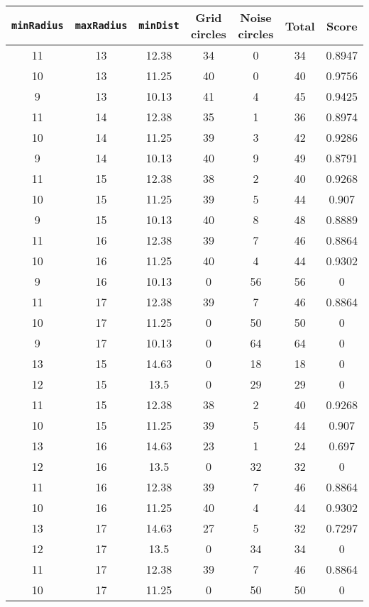 \documentclass[letterpaper, 12pt]{article}
\begin{document}
\begin{longtable}{|c|c|c|c|c|c|c|}
\hline
\textbf{\texttt{minRadius}} & \textbf{\texttt{maxRadius}} & \textbf{\texttt{minDist}} & \textbf{Grid circles} & \textbf{Noise circles} & \textbf{Total} & \textbf{Score} \\
\hline
11 & 13 & 12.38 & 34 & 0 & 34 & 0.8947 \\
\hline
10 & 13 & 11.25 & 40 & 0 & 40 & 0.9756 \\
\hline
9 & 13 & 10.13 & 41 & 4 & 45 & 0.9425 \\
\hline
11 & 14 & 12.38 & 35 & 1 & 36 & 0.8974 \\
\hline
10 & 14 & 11.25 & 39 & 3 & 42 & 0.9286 \\
\hline
9 & 14 & 10.13 & 40 & 9 & 49 & 0.8791 \\
\hline
11 & 15 & 12.38 & 38 & 2 & 40 & 0.9268 \\
\hline
10 & 15 & 11.25 & 39 & 5 & 44 & 0.907 \\
\hline
9 & 15 & 10.13 & 40 & 8 & 48 & 0.8889 \\
\hline
11 & 16 & 12.38 & 39 & 7 & 46 & 0.8864 \\
\hline
10 & 16 & 11.25 & 40 & 4 & 44 & 0.9302 \\
\hline
9 & 16 & 10.13 & 0 & 56 & 56 & 0 \\
\hline
11 & 17 & 12.38 & 39 & 7 & 46 & 0.8864 \\
\hline
10 & 17 & 11.25 & 0 & 50 & 50 & 0 \\
\hline
9 & 17 & 10.13 & 0 & 64 & 64 & 0 \\
\hline
13 & 15 & 14.63 & 0 & 18 & 18 & 0 \\
\hline
12 & 15 & 13.5 & 0 & 29 & 29 & 0 \\
\hline
11 & 15 & 12.38 & 38 & 2 & 40 & 0.9268 \\
\hline
10 & 15 & 11.25 & 39 & 5 & 44 & 0.907 \\
\hline
13 & 16 & 14.63 & 23 & 1 & 24 & 0.697 \\
\hline
12 & 16 & 13.5 & 0 & 32 & 32 & 0 \\
\hline
11 & 16 & 12.38 & 39 & 7 & 46 & 0.8864 \\
\hline
10 & 16 & 11.25 & 40 & 4 & 44 & 0.9302 \\
\hline
13 & 17 & 14.63 & 27 & 5 & 32 & 0.7297 \\
\hline
12 & 17 & 13.5 & 0 & 34 & 34 & 0 \\
\hline
11 & 17 & 12.38 & 39 & 7 & 46 & 0.8864 \\
\hline
10 & 17 & 11.25 & 0 & 50 & 50 & 0 \\

\end{longtable}
\end{document}
